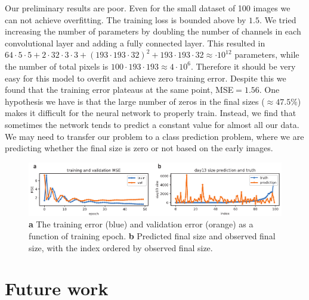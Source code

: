 \documentclass[10pt,twocolumn,letterpaper]{article}
\begin{document}
Our preliminary results are poor.  Even for the small dataset of 100 images we can not achieve overfitting.  The training loss is bounded above by $1.5$.   We tried increasing the number of parameters by doubling the number of channels in each convolutional layer and adding a fully connected layer.  This resulted in $64 \cdot 5 \cdot 5 + 2 \cdot 32 \cdot 3 \cdot 3 + (193 \cdot 193 \cdot 32)^2 + 193 \cdot 193 \cdot 32 \approx \cdot 10^{12}$ parameters, while the number of total pixels is $100 \cdot 193 \cdot 193 \approx 4 \cdot 10^{6}$.  Therefore it should be very easy for this model to overfit and achieve zero training error.  Despite this we found that the training error plateaus at the same point, MSE$=1.56$.  One hypothesis we have is that the large number of zeros in the final sizes ($\approx 47.5 \%$) makes it difficult for the neural network to properly train.  Instead, we find that sometimes the network tends to predict a constant value for almost all our data.  We may need to transfer our problem to a class prediction problem, where we are predicting whether the final size is zero or not based on the early images.  

\begin{figure}[t!]
\begin{center}
 \includegraphics[width=0.8\linewidth]{figures/error_vs_epoch_and_validation_predictions_vs_observed.pdf}
\end{center}
   \caption{\textbf{a} The training error (blue) and validation error (orange) as a function of training epoch.  \textbf{b} Predicted final size and observed final size, with the index ordered by observed final size. }
\label{results}
\end{figure}


\section{Future work}
\end{document}
